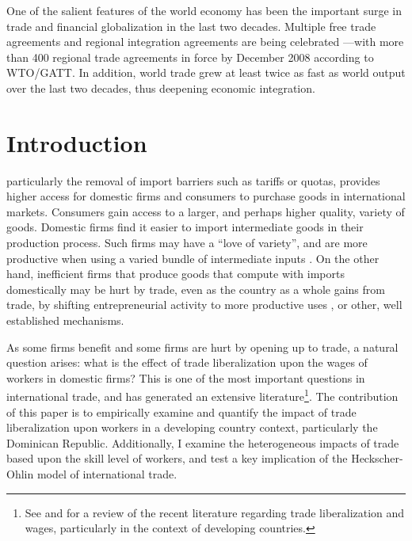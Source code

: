 \begin{savequote}[75mm] 
One  of  the  salient  features  of  the  world  economy  has  been  the  important  surge  in  trade  and 
financial globalization in the last two decades. Multiple free trade agreements and regional integration 
agreements  are  being  celebrated  —with  more  than  400  regional  trade  agreements  in  force  by 
December 2008 according to WTO/GATT. In addition, world trade grew at least twice as fast as world 
output over the last two decades, thus deepening economic integration. 
\end{savequote}

\chapter{Introduction}
\label{sec:Introduction}

 particularly the removal of import barriers such as tariffs or quotas, 
provides higher access for domestic firms and consumers to purchase goods in international markets. 
Consumers gain access to a larger, and perhaps higher quality, variety of goods. 
Domestic firms find it easier to import intermediate goods in their production process.
Such firms may have a ``love of variety'', and are more productive when using 
a varied bundle of intermediate inputs \citep{dixit1977monopolistic}. On the other hand, 
inefficient firms that produce goods that compute with imports domestically 
may be hurt by trade, even as the country as a whole gains from trade, by shifting entrepreneurial
activity to more productive uses \citep{holmes2}, or other, well established mechanisms.

As some firms benefit and some firms are hurt by opening up to trade, a natural question arises:
what is the effect of trade liberalization upon the wages of workers in domestic firms?  
This is one of the most important questions in international trade, and has generated
an extensive literature\footnote{See \citet{feenstraglobal} and \citet{goldberg} for a review
of the recent literature regarding trade liberalization and wages, particularly in the context
of developing countries.}. The contribution of this paper 
is to empirically examine and quantify the impact of trade liberalization upon workers in a
developing country context, particularly the Dominican Republic. Additionally, I examine 
the heterogeneous impacts of trade based upon the skill level of workers, and test a key implication of
the Heckscher-Ohlin model of international trade. 

